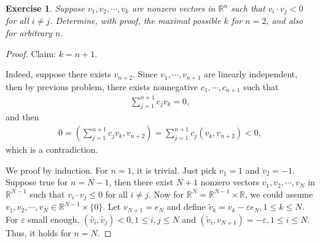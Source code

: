 \documentclass[10pt]{book}
\newtheorem{exercise}{Exercise}[section]
\theoremstyle{definition}
\numberwithin{equation}{chapter}
\begin{document}
\medskip

\begin{exercise}{\bf *}
Suppose $v_1, v_2, \cdots, v_k$ are nonzero vectors in $\mathbb{R}^n$ such that $v_i \cdot v_j < 0$ for all $i \neq j$. Determine, with proof, the maximal possible $k$ for $n = 2$, and also for arbitrary $n$.
\end{exercise}
\begin{proof}
Claim: $k = n + 1$. 

Indeed, suppose there exists $v_{n+2}$. Since $v_1, \cdots, v_{n+1}$ are linearly independent, then by previous problem, there exists nonnegative $c_1, \cdots, c_{n+1}$ such that
\begin{align*}
    \sum^{n+1}_{j=1} c_j v_k = 0,
\end{align*}
and then
\begin{align*}
    0 = \left(\sum^{n+1}_{j=1} c_j v_k, v_{n+2}\right) = \sum^{n+1}_{j=1} c_j \left(v_k, v_{n+2} \right) < 0,
\end{align*}
which is a contradiction. 

We proof by induction. For $n = 1$, it is trivial. Just pick $v_1 = 1$ and $v_2 = -1$. Suppose true for $n = N - 1$, then there exist $N+1$ nonzero vectors $v_1, v_2, \cdots, v_{N}$ in $\mathbb{R}^{N-1}$ such that $v_i \cdot v_j \leq 0$ for all $i \neq j$. Now for $\mathbb{R}^N = \mathbb{R}^{N-1} \times \mathbb{R}$, we could assume $v_1, v_2, \cdots, v_{N} \in \mathbb{R}^{N-1} \times \{0\}$. Let $v_{N+1} = e_N$ and define $\widetilde{v}_k = v_k - \varepsilon e_N, 1 \leq k \leq N$. For $\varepsilon$ small enough, $\left(\tilde{v_i}, \tilde{v_j}\right) < 0, 1 \leq i,j \leq N$ and $\left(\tilde{v}_i, v_{N+1} \right) = - \varepsilon, 1 \leq i \leq N$. Thus, it holds for $n = N$.
\end{proof}

\medskip
\end{document}
